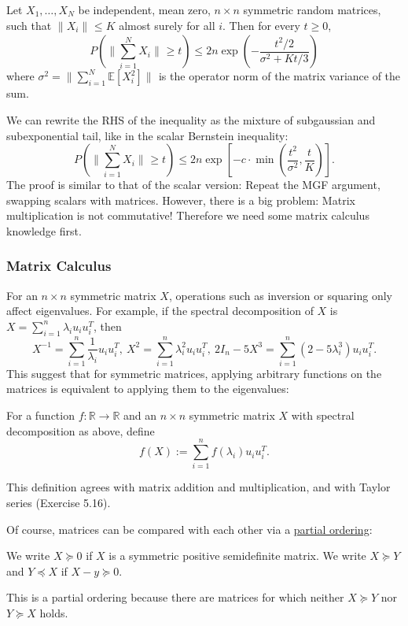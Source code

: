 \begin{theorem}
\label{thm:5.4.1}
Let $X_1, \dots, X_N$ be independent, mean zero, $n \times n$ symmetric random matrices, such that 
$\lVert X_i \rVert_{} \leq K$ almost surely for all $i$. Then for every $t \geq 0$, 
\[ P \left( \lVert \sum_{i = 1}^{N}X_i \rVert_{} \geq t \right) \leq 
2n \exp{\left( -\frac{t^2 / 2}{\sigma^2 + Kt / 3} \right)} \]
where $\sigma^2 = \lVert \sum_{i = 1}^{N} \mathbb{E}[X_i^2] \rVert_{}$ is the operator norm of the matrix 
variance of the sum.
\end{theorem}
We can rewrite the RHS of the inequality as the mixture of subgaussian and subexponential tail, like in the 
scalar Bernstein inequality:
\[ P \left( \lVert \sum_{i = 1}^{N}X_i \rVert_{} \geq t \right) \leq 
2n \exp{\left[ -c \cdot \min_{}\left( \frac{t^2}{\sigma^2}, \frac{t}{K} \right) \right]}. \]
The proof is similar to that of the scalar version: Repeat the MGF argument, swapping scalars with matrices. 
However, there is a big problem: Matrix multiplication is not commutative! Therefore we need some matrix 
calculus knowledge first.


\subsubsection{Matrix Calculus}
For an $n \times n$ symmetric matrix $X$, operations such as inversion or squaring only affect eigenvalues. 
For example, if the spectral decomposition of $X$ is $X = \sum_{i = 1}^{n} \lambda_i u_iu_i^T$, then
\[ X^{-1} = \sum_{i = 1}^{n} \frac{1}{\lambda_i}u_iu_i^T, \ 
X^2 = \sum_{i = 1}^{n} \lambda_i^2 u_iu_i^T, \ 
2I_n - 5X^3 = \sum_{i = 1}^{n} (2 - 5 \lambda_i^3)u_iu_i^T. \]
This suggest that for symmetric matrices, applying arbitrary functions on the matrices is equivalent to 
applying them to the eigenvalues:

\begin{definition}
\label{def:5.4.2}
For a function $f: \mathbb{R} \to \mathbb{R}$ and an $n \times n$ symmetric matrix $X$ with spectral 
decomposition as above, define 
\[ f(X) := \sum_{i = 1}^{n} f(\lambda_i)u_iu_i^T. \]
\end{definition}
This definition agrees with matrix addition and multiplication, and with Taylor series (Exercise 5.16).

Of course, matrices can be compared with each other via a \underline{partial ordering}:
\begin{definition}[Loewner order]
\label{def:5.4.3}
We write $X \succcurlyeq 0$ if $X$ is a symmetric positive semidefinite matrix. We write $X \succeq Y$ and 
$Y \preceq X$ if $X - y \succeq 0$.
\end{definition}
This is a partial ordering because there are matrices for which neither $X \succeq Y$ nor $Y \succeq X$ holds.

